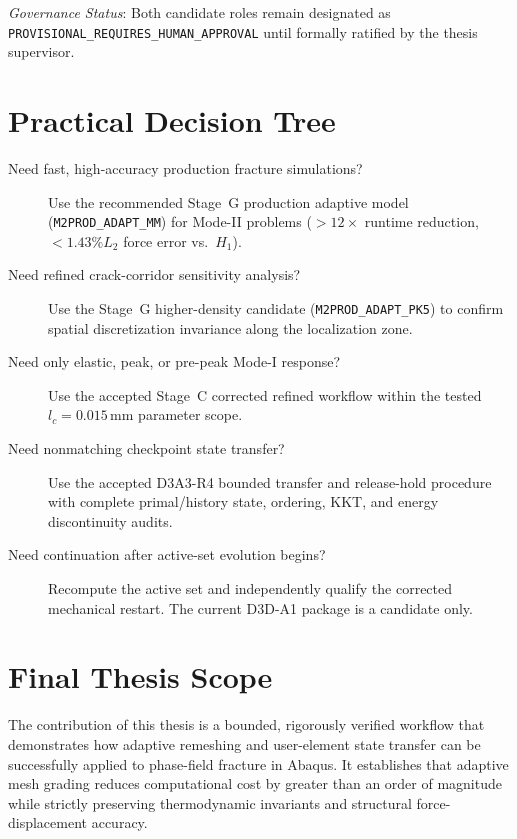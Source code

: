 \noindent\textit{Governance Status}: Both candidate roles remain designated as \texttt{PROVISIONAL\_REQUIRES\_HUMAN\_APPROVAL} until formally ratified by the thesis supervisor.

\section{Practical Decision Tree}

\begin{description}
  \item[Need fast, high-accuracy production fracture simulations?]
  Use the recommended Stage~G production adaptive model (\texttt{M2PROD\_ADAPT\_MM}) for Mode-II problems ($>12\times$ runtime reduction, $<1.43\% L_2$ force error vs.\ $H_1$).
  
  \item[Need refined crack-corridor sensitivity analysis?]
  Use the Stage~G higher-density candidate (\texttt{M2PROD\_ADAPT\_PK5}) to confirm spatial discretization invariance along the localization zone.

  \item[Need only elastic, peak, or pre-peak Mode-I response?]
  Use the accepted Stage~C corrected refined workflow within the tested
  \(l_c=0.015\,\mathrm{mm}\) parameter scope.

  \item[Need nonmatching checkpoint state transfer?]
  Use the accepted D3A3-R4 bounded transfer and release-hold procedure with
  complete primal/history state, ordering, KKT, and energy discontinuity audits.

  \item[Need continuation after active-set evolution begins?]
  Recompute the active set and independently qualify the corrected mechanical
  restart. The current D3D-A1 package is a candidate only.
\end{description}

\section{Final Thesis Scope}

The contribution of this thesis is a bounded, rigorously verified workflow that
demonstrates how adaptive remeshing and user-element state transfer can be
successfully applied to phase-field fracture in Abaqus. It establishes that
adaptive mesh grading reduces computational cost by greater than an order of
magnitude while strictly preserving thermodynamic invariants and structural
force-displacement accuracy.
